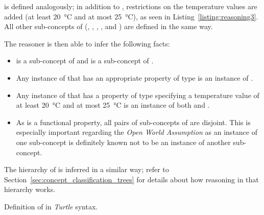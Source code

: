  is defined analogously; in addition to , restrictions on the temperature values are added (at least \SI{20}{\celsius} and at most \SI{25}{\celsius}), as seen in Listing~\ref{listing:reasoning3}. All other sub-concepts of  (, , , , and ) are defined in the same way.

The  reasoner is then able to infer the following facts:
\begin{itemize}
  \item {} is a sub-concept of  and  is a sub-concept of .
  \item Any instance of  that has an appropriate property of type  is an instance of .
  \item Any instance of  that has a property of type  specifying a temperature value of at least \SI{20}{\celsius} and at most \SI{25}{\celsius} is an instance of both  and .
  \item As  is a functional property, all pairs of sub-concepts of  are disjoint. This is especially important regarding the \emph{Open World Assumption} as an instance of one sub-concept is definitely known not to be an instance of another sub-concept.
\end{itemize}

The hierarchy of  is inferred in a similar way; refer to Section~\ref{sec:concept_classification_trees} for details about how reasoning in that hierarchy works.


\begin{mintlisting}

\caption[Definition of  in \emph{Turtle} syntax]{Definition of  in \emph{Turtle} syntax.}
\label{listing:reasoning4}
\end{mintlisting}

